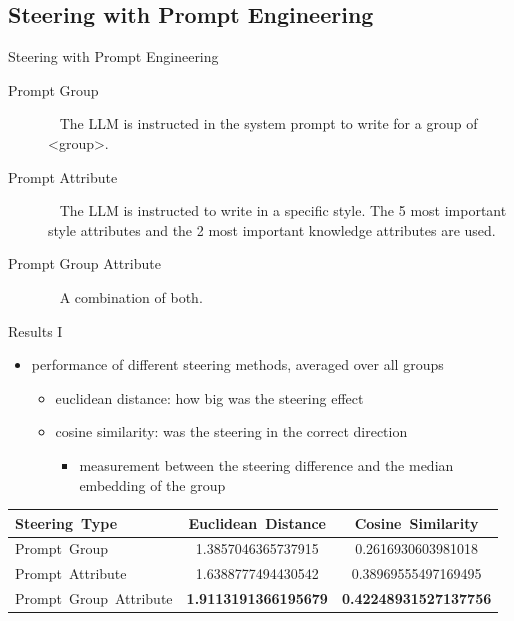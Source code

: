 \documentclass[]{beamer}
\begin{document}
\subsection{Steering with Prompt Engineering}
\begin{frame}{Steering with Prompt Engineering}
  \begin{description}
    \item[Prompt Group] ~\linebreak
          The LLM is instructed in the system prompt to write for a group of <group>.
    \item[Prompt Attribute] ~\linebreak
          The LLM is instructed to write in a specific style. The 5 most important style attributes and the 2 most important knowledge attributes are used.
    \item[Prompt Group Attribute] ~\linebreak
          A combination of both.
  \end{description}
\end{frame}

\begin{frame}{Results I}
  \begin{itemize}
    \item performance of different steering methods, averaged over all groups
          \begin{itemize}
            \item euclidean distance: how big was the steering effect
            \item cosine similarity: was the steering in the correct direction
                  \begin{itemize}
                    \item measurement between the steering difference and the median embedding of the group
                  \end{itemize}
          \end{itemize}
  \end{itemize}
  \begin{tabular}{lSS}
    \toprule
    {Steering\ Type}         & {Euclidean\ Distance}                              & {Cosine\ Similarity}                                \\
    \midrule
    Prompt\ Group            & 1.3857046365737915                                 & 0.2616930603981018                                  \\
    Prompt\ Attribute        & 1.6388777494430542                                 & 0.38969555497169495                                 \\
    Prompt\ Group\ Attribute &  \bfseries 1.9113191366195679 &  \bfseries 0.42248931527137756 \\
    \bottomrule
  \end{tabular}
\end{frame}
\end{document}
